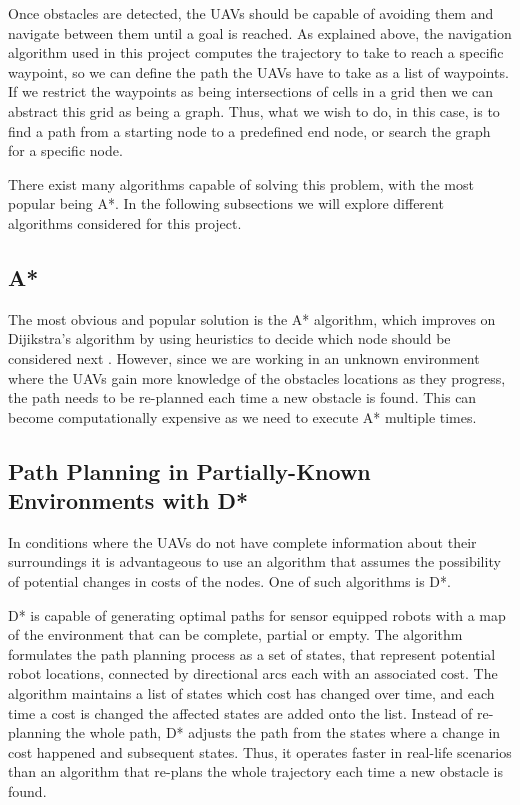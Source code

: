Once obstacles are detected, the UAVs should be capable of avoiding them and navigate between them 
until a goal is reached. As explained above, the navigation algorithm used in this project computes
the trajectory to take to reach a specific waypoint, so we can define the path the UAVs have to take
as a list of waypoints. If we restrict the waypoints as being intersections of cells in a grid then
we can abstract this grid as being a graph. Thus, what we wish to do, in this case, is to find a path
from a starting node to a predefined end node, or search the graph for a specific node. 

There exist many algorithms capable of solving this problem, with the most popular being A*.
In the following subsections we will explore different algorithms considered for this project.


\subsection{A*}

The most obvious and popular solution is the A* algorithm, which improves on Dijikstra's algorithm
by using heuristics to decide which node should be considered next \autocite{ADA}. However, since we 
are working in an unknown environment where the UAVs gain more knowledge of the obstacles locations as
they progress, the path needs to be re-planned each time a new obstacle is found. This can become
computationally expensive as we need to execute A* multiple times. 

\subsection{Path Planning in Partially-Known Environments with D*}

In conditions where the UAVs do not have complete information about their surroundings it is 
advantageous to use an algorithm that assumes the possibility of potential changes in costs of the nodes. 
One of such algorithms is D*. 

D* is capable of generating optimal paths for sensor equipped robots with a map of the environment that 
can be complete, partial or empty. The algorithm formulates the path planning process as a set of states,
that represent potential robot locations, connected by directional arcs each with an associated cost. The 
algorithm maintains a list of states which cost has changed over time, and each time a cost is changed
the affected states are added onto the list. Instead of re-planning the whole path, D* adjusts the path
from the states where a change in cost happened and subsequent states. Thus, it operates faster in real-life
scenarios than an algorithm that re-plans the whole trajectory each time a new obstacle is found. \autocite{AS94}

